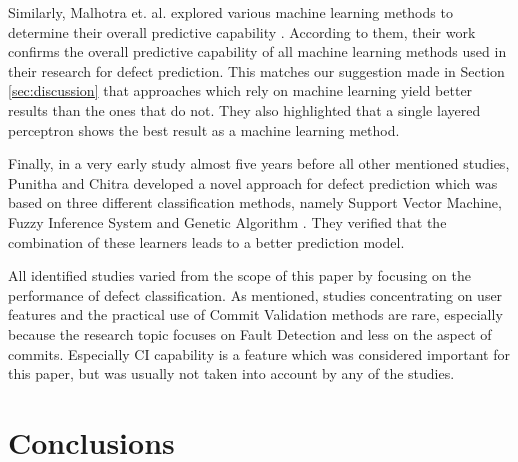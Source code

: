 Similarly, Malhotra et. al. explored various machine learning methods to determine their overall predictive capability \cite{Malhotra2017}. According to them, their work confirms the overall predictive capability of all machine learning methods used in their research for defect prediction. This matches our suggestion made in Section \ref{sec:discussion} that approaches which rely on machine learning yield better results than the ones that do not. They also highlighted that a single layered perceptron shows the best result as a machine learning method.

Finally, in a very early study almost five years before all other mentioned studies, Punitha and Chitra developed a novel approach for defect prediction which was based on three different classification methods, namely Support Vector Machine, Fuzzy Inference System and Genetic Algorithm \cite{Punitha2013}. They verified that the combination of these learners leads to a better prediction model.

All identified studies varied from the scope of this paper by focusing on the performance of defect classification. As mentioned, studies concentrating on user features and the practical use of Commit Validation methods are rare, especially because the research topic focuses on Fault Detection and less on the aspect of commits. Especially CI capability is a feature which was considered important for this paper, but was usually not taken into account by any of the studies.


\section{Conclusions}
\label{sec:conclusions}


